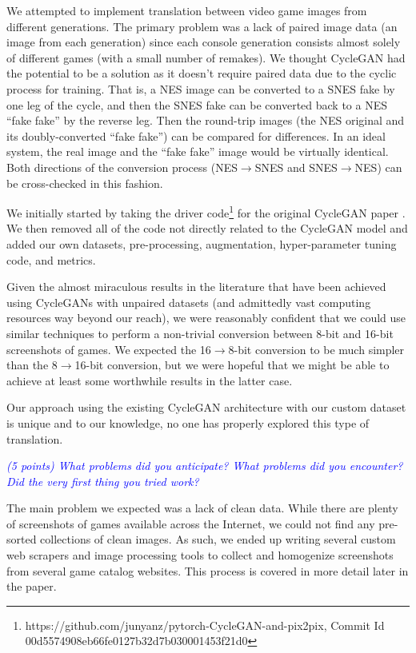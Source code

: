 \documentclass[10pt,twocolumn,letterpaper]{article}
\begin{document}
We attempted to implement translation between video game images from different generations. The primary problem was a lack of paired image data (an image from each generation) since each console generation consists almost solely of different games (with a small number of remakes). We thought CycleGAN had the potential to be a solution as it doesn't require paired data due to the cyclic process for training. That is, a NES image can be converted to a SNES fake by one leg of the cycle, and then the SNES fake can be converted back to a NES ``fake fake'' by the reverse leg. Then the round-trip images (the NES original and its doubly-converted ``fake fake'') can be compared for differences. In an ideal system, the real image and the ``fake fake'' image would be virtually identical. Both directions of the conversion process (NES$\rightarrow$SNES and SNES$\rightarrow$NES) can be cross-checked in this fashion.

We initially started by taking the driver code\footnote{https://github.com/junyanz/pytorch-CycleGAN-and-pix2pix, Commit Id 00d5574908eb66fe0127b32d7b030001453f21d0} for the original CycleGAN paper \cite{CycleGAN}. We then removed all of the code not directly related to the CycleGAN model and added our own datasets, pre-processing, augmentation, hyper-parameter tuning code, and metrics.

Given the almost miraculous results in the literature that have been achieved using CycleGANs with unpaired datasets (and admittedly vast computing resources way beyond our reach), we were reasonably confident that we could use similar techniques to perform a non-trivial conversion between 8-bit and 16-bit screenshots of games. We expected the 16$\rightarrow$8-bit conversion to be much simpler than the 8$\rightarrow$16-bit conversion, but we were hopeful that we might be able to achieve at least some worthwhile results in the latter case.

Our approach using the existing CycleGAN architecture with our custom dataset is unique and to our knowledge, no one has properly explored this type of translation.

\textit{\textcolor{blue}{(5 points) What problems did you anticipate? What problems did you encounter? Did the very first thing you tried work?}}

The main problem we expected was a lack of clean data. While there are plenty of screenshots of games available across the Internet, we could not find any pre-sorted collections of clean images. As such, we ended up writing several custom web scrapers and image processing tools to collect and homogenize screenshots from several game catalog websites. This process is covered in more detail later in the paper.
\end{document}
